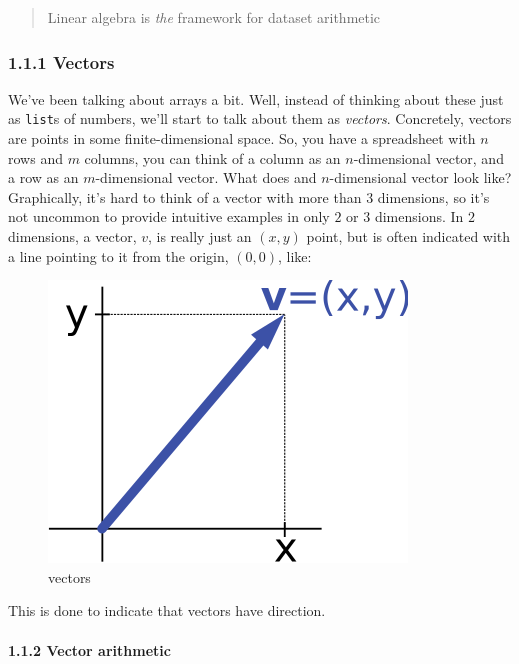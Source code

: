 \documentclass[11pt]{article}
\makeatletter
\def\maxwidth{\ifdim\Gin@nat@width>\linewidth\linewidth
    \else\Gin@nat@width\fi}
\let\Oldincludegraphics\includegraphics
\renewcommand{\includegraphics}[1]{\Oldincludegraphics[width=.8\maxwidth]{#1}}
\makeatother
\begin{document}
\begin{quote}
Linear algebra is \emph{the} framework for dataset arithmetic
\end{quote}

    \hypertarget{vectors}{%
\subsubsection{1.1.1 Vectors}\label{vectors}}

We've been talking about arrays a bit. Well, instead of thinking about
these just as \texttt{list}s of numbers, we'll start to talk about them
as \emph{vectors}. Concretely, vectors are points in some
finite-dimensional space. So, you have a spreadsheet with \(n\) rows and
\(m\) columns, you can think of a column as an \(n\)-dimensional vector,
and a row as an \(m\)-dimensional vector. What does and
\(n\)-dimensional vector look like? Graphically, it's hard to think of a
vector with more than \(3\) dimensions, so it's not uncommon to provide
intuitive examples in only \(2\) or \(3\) dimensions. In \(2\)
dimensions, a vector, \(v\), is really just an \((x,y)\) point, but is
often indicated with a line pointing to it from the origin, \((0,0)\),
like:

\begin{figure}
\centering
\includegraphics{images/Vector_components.png}
\caption{vectors}
\end{figure}

This is done to indicate that vectors have direction.

    \hypertarget{vector-arithmetic}{%
\paragraph{1.1.2 Vector arithmetic}\label{vector-arithmetic}}
\end{document}
